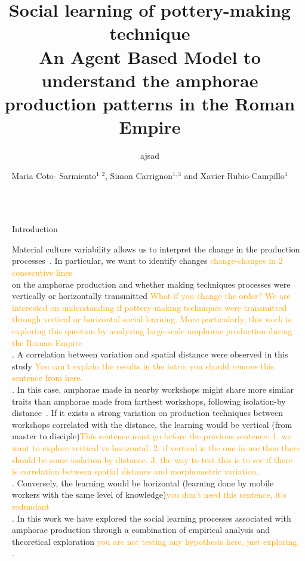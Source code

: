 \documentclass[final]{beamer}
\title{Social learning of pottery-making technique\\{\huge An Agent Based Model to understand the amphorae production patterns in the Roman Empire}}
\subtitle{ajsad}
\author{Maria Coto- Sarmiento$^{1,2}$, Simon Carrignon$^{1,3}$ and Xavier Rubio-Campillo$^{1}$} %
\institute{$^1$Barcelona Supercomputing Center -- $^2$University of Barcelona -- $^3$Universitat Pompeu Fabra} %
\newcommand{\memo}[2]{\textcolor{#1}{#2}}
\newcommand{\xavi}[1]{\memo{orange}{#1\\}}
\newlength{\sepwid}
\newlength{\onecolwid}
\begin{document}

\setlength{\belowcaptionskip}{2ex} %
\setlength\belowdisplayshortskip{2ex} %

\begin{frame}[t] %

\begin{columns}[t] %

\begin{column}{\sepwid}\end{column} %

\begin{column}{\onecolwid} %


\begin{block}{Introduction}

\justify

Material culture variability allows us to interpret the change in the production processes~\cite{lycett}. In particular, we want to identify changes \xavi{change-changes in 2 consecutive lines} on the amphorae production and whether making techniques processes were vertically or horizontally transmitted \xavi{What if you change the order? We are interested on understanding if pottery-making techniques were transmitted through vertical or horizontal social learning. More particularly, this work is exploring this question by analyzing large-scale amphorae production during the Roman Empire}. A correlation between variation and spatial distance were observed in this study \xavi{You can't explain the results in the intro; you should remove this sentence from here.}. In this case, amphorae made in nearby workshops might share more similar traits than amphorae made from farthest workshops, following isolation-by distance~\cite{bjo}. If it exists a strong variation on production techniques between workshops correlated with the distance, the learning would be vertical (from master to disciple)\xavi{This sentence must go before the previous sentence: 1. we want to explore vertical vs horizontal. 2. if vertical is the one in use then there should be some isolation by distance. 3. the way to test this is to see if there is correlation between spatial distance and morphometric variation.}. Conversely, the learning would be horizontal (learning done by mobile workers with the same level of knowledge)\xavi{you don't need this sentence, it's redundant}. In this work we have explored the social learning processes associated with amphorae production through a combination of empirical analysis and theoretical exploration \xavi{you are not testing any hypothesis here, just exploring.}.


\end{block}
\end{column}
\end{columns}
\end{frame}
\end{document}
